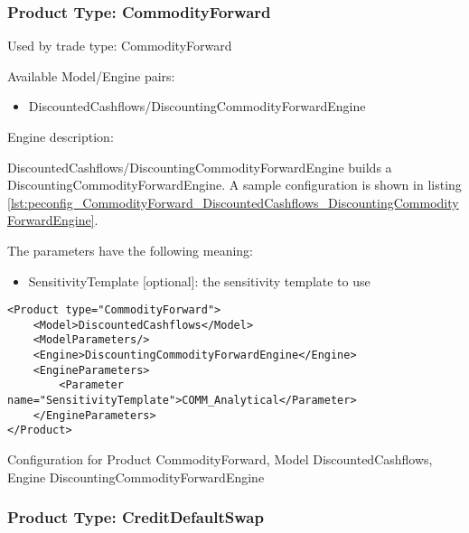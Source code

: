 \subsubsection{Product Type: CommodityForward}

Used by trade type: CommodityForward

Available Model/Engine pairs:

\begin{itemize}
\item DiscountedCashflows/DiscountingCommodityForwardEngine
\end{itemize}

Engine description:

DiscountedCashflows/DiscountingCommodityForwardEngine builds a DiscountingCommodityForwardEngine. A sample configuration is shown in listing
\ref{lst:peconfig_CommodityForward_DiscountedCashflows_DiscountingCommodityForwardEngine}.

The parameters have the following meaning:

\begin{itemize}
\item SensitivityTemplate [optional]: the sensitivity template to use 
\end{itemize}

\begin{longlisting}
\begin{verbatim}
<Product type="CommodityForward">
    <Model>DiscountedCashflows</Model>
    <ModelParameters/>
    <Engine>DiscountingCommodityForwardEngine</Engine>
    <EngineParameters>
        <Parameter name="SensitivityTemplate">COMM_Analytical</Parameter>
    </EngineParameters>
</Product>
\end{verbatim}
\caption{Configuration for Product CommodityForward, Model DiscountedCashflows, Engine DiscountingCommodityForwardEngine}
\label{lst:peconfig_CommodityForward_DiscountedCashflows_DiscountingCommodityForwardEngine}
\end{longlisting}

\subsubsection{Product Type: CreditDefaultSwap}

